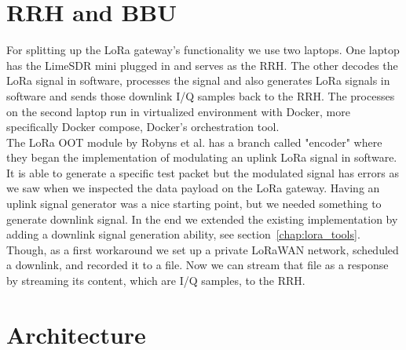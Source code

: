\section{RRH and BBU}
For splitting up the LoRa gateway's functionality we use two laptops. 
One laptop has the LimeSDR mini plugged in and serves as the RRH. The other decodes the LoRa
signal in software, processes the signal and also generates LoRa signals in software and sends those downlink I/Q samples back to the RRH.
The processes on the second laptop run in virtualized environment with Docker, more specifically Docker compose, Docker's orchestration tool.
\\
The LoRa OOT module by Robyns et al. has a branch called "encoder" where they began the implementation of modulating an uplink LoRa signal in software.
It is able to generate a specific test packet but the modulated signal has errors as we saw when we inspected the data payload on the LoRa gateway.
Having an uplink signal generator was a nice starting point, but we needed something to generate downlink signal. In the end we extended the existing implementation
by adding a downlink signal generation ability, see section~\ref{chap:lora_tools}.
\\
Though, as a first workaround we set up a private LoRaWAN network, scheduled a downlink, and recorded it to a file. Now we can stream that file as a response by streaming its content,
which are I/Q samples, to the RRH.


\section{Architecture}
